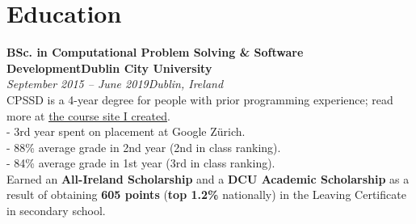 \documentclass[a4paper, oneside, final]{scrartcl}
\newcommand{\nasc}[2]{\href{#1}{\color{blue}\setulcolor{blue}\ul{#2}}}
\newcommand{\fmtdate}[1]{\textit{#1}}
\newcommand{\fmtaddress}[1]{\textit{#1}}
\newcommand{\fmtjobtitle}[1]{\textbf{#1}}
\newcommand{\fmtskill}[1]{\textbf{#1}}
\begin{document}
\section{Education}
\fmtjobtitle{BSc. in Computational Problem Solving \& Software Development\hfill Dublin City University}\\
\fmtdate{September 2015 -- June 2019}\hfill\fmtaddress{Dublin, Ireland}\\
CPSSD is a 4-year degree for people with prior programming experience; read more at \nasc{https://cpssd.net}{the course site I created}.\\
- 3rd year spent on placement at Google Zürich.\\
- 88\% average grade in 2nd year (2nd in class ranking).\\
- 84\% average grade in 1st year (3rd in class ranking).\\
Earned an \fmtskill{All-Ireland Scholarship} and a \fmtskill{DCU Academic Scholarship} as a result of obtaining \fmtskill{605 points} (\fmtskill{top 1.2\%} nationally) in the Leaving
Certificate in secondary school.
\end{document}
